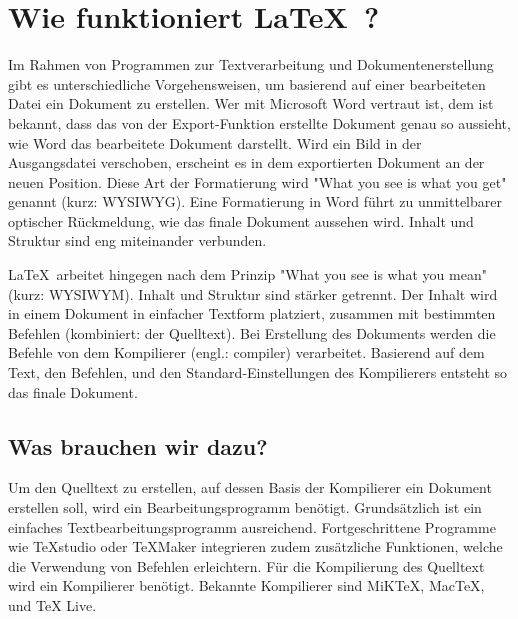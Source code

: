 \section{Wie funktioniert \LaTeX \  ?} %
\label{sec:wie_funktioniert_latex_}

Im Rahmen von Programmen zur Textverarbeitung und Dokumentenerstellung gibt es unterschiedliche Vorgehensweisen, um basierend auf einer bearbeiteten Datei ein Dokument zu erstellen. Wer mit Microsoft Word vertraut ist, dem ist bekannt, dass das von der Export-Funktion erstellte Dokument genau so aussieht, wie Word das bearbeitete Dokument darstellt. Wird ein Bild in der Ausgangsdatei verschoben, erscheint es in dem exportierten Dokument an der neuen Position. Diese Art der Formatierung wird "What you see is what you get" genannt (kurz: WYSIWYG). Eine Formatierung in Word führt zu unmittelbarer optischer Rückmeldung, wie das finale Dokument aussehen wird. Inhalt und Struktur sind eng miteinander verbunden.

\LaTeX \  arbeitet hingegen nach dem Prinzip "What you see is what you mean" (kurz: WYSIWYM). Inhalt und Struktur sind stärker getrennt. Der Inhalt wird in einem Dokument in einfacher Textform platziert, zusammen mit bestimmten Befehlen (kombiniert: der Quelltext). Bei Erstellung des Dokuments werden die Befehle von dem Kompilierer (engl.: compiler) verarbeitet. Basierend auf dem Text, den Befehlen, und den Standard-Einstellungen des Kompilierers entsteht so das finale Dokument. 

\subsection{Was brauchen wir dazu?} %
\label{sub:was_brauchen_wir_dazu}
Um den Quelltext zu erstellen, auf dessen Basis der Kompilierer ein Dokument erstellen soll, wird ein Bearbeitungsprogramm benötigt. Grundsätzlich ist ein einfaches Textbearbeitungsprogramm ausreichend. Fortgeschrittene Programme wie TeXstudio oder TeXMaker integrieren zudem zusätzliche Funktionen, welche die Verwendung von Befehlen erleichtern.
Für die Kompilierung des Quelltext wird ein Kompilierer benötigt. Bekannte Kompilierer sind MiKTeX, MacTeX, und TeX Live. 

